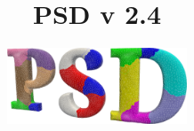 \documentclass{report}
\title{\Huge \textbf{PSD v 2.4}}
\author{\includegraphics[width=0.4\textwidth]{./Images/logo.png}}
\begin{document}
	\maketitle
	
	\pagebreak
	\tableofcontents
	\pagebreak
	
	
	
	
	
	
	
	
	
	
	\pagebreak
	\printbibliography
\end{document}
